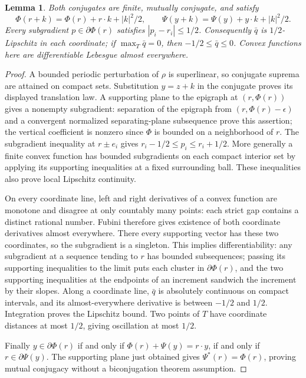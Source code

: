 \documentclass[11pt]{article}
\newtheorem{lemma}[theorem]{Lemma}
\begin{document}
\begin{lemma}\label{newrad:convex}
Both conjugates are finite, mutually conjugate, and satisfy
\[
 \Phi(r+k)=\Phi(r)+r\cdot k+|k|^2/2,\qquad
 \Psi(y+k)=\Psi(y)+y\cdot k+|k|^2/2.
\]
Every subgradient $p\in\partial\Phi(r)$ satisfies
$|p_i-r_i|\le1/2$. Consequently $\bar q$ is $1/2$-Lipschitz in each
coordinate; if $\max_T\bar q=0$, then $-1/2\le\bar q\le0$.
Convex functions here are differentiable Lebesgue almost everywhere.
\end{lemma}
\begin{proof}
A bounded periodic perturbation of $\rho$ is superlinear, so conjugate
suprema are attained on compact sets. Substitution $y=z+k$ in the
conjugate proves its displayed translation law. A supporting plane to
the epigraph at $(r,\Phi(r))$ gives a nonempty subgradient: separation
of the epigraph from $(r,\Phi(r)-\epsilon)$ and a convergent normalized
separating-plane subsequence prove this assertion; the vertical coefficient
is nonzero since $\Phi$ is bounded on a neighborhood of $r$.
The subgradient inequality at $r\pm e_i$ gives
$r_i-1/2\le p_i\le r_i+1/2$. More generally a finite convex function
has bounded subgradients on each compact interior set by applying its
supporting inequalities at a fixed surrounding ball. These inequalities
also prove local Lipschitz continuity.

On every coordinate line, left and right derivatives of a convex
function are monotone and disagree at only countably many points:
each strict gap contains a distinct rational number. Fubini therefore
gives existence of both coordinate derivatives almost everywhere.
There every supporting vector has these two coordinates, so the
subgradient is a singleton. This implies differentiability: any
subgradient at a sequence tending to $r$ has bounded subsequences;
passing its supporting inequalities to the limit puts each cluster
in $\partial\Phi(r)$, and the two supporting inequalities at the
endpoints of an increment sandwich the increment by their slopes.
Along a coordinate line, $\bar q$ is absolutely continuous on compact
intervals, and its almost-everywhere derivative is between $-1/2$ and
$1/2$. Integration proves the Lipschitz bound. Two points of $T$ have
coordinate distances at most $1/2$, giving oscillation at most $1/2$.

Finally $y\in\partial\Phi(r)$ if and only if
$\Phi(r)+\Psi(y)=r\cdot y$, if and only if
$r\in\partial\Psi(y)$. The supporting plane just obtained gives
$\Psi^*(r)=\Phi(r)$, proving mutual conjugacy without a biconjugation
theorem assumption.
\end{proof}
\end{document}

